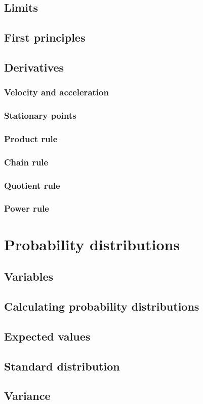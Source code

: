\documentclass{book}
\begin{document}
\section{Limits}

\section{First principles}

\section{Derivatives}

\subsection{Velocity and acceleration}

\subsection{Stationary points}

\subsection{Product rule}

\subsection{Chain rule}

\subsection{Quotient rule}

\subsection{Power rule}

\chapter{Probability distributions}
\section{Variables}

\section{Calculating probability distributions}

\section{Expected values}

\section{Standard distribution}

\section{Variance}
\end{document}
